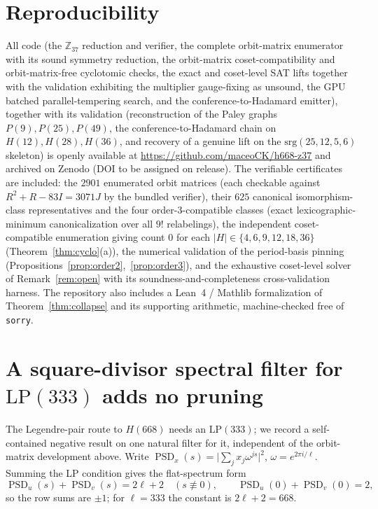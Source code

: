 \documentclass[11pt]{article}
\theoremstyle{definition}
\DeclareMathOperator{\PSD}{PSD}
\newcommand{\Z}{\mathbb{Z}}
\begin{document}
\section*{Reproducibility}
All code (the $\Z_{37}$ reduction and verifier, the complete orbit-matrix enumerator with its sound symmetry
reduction, the orbit-matrix coset-compatibility and orbit-matrix-free cyclotomic checks, the exact and
coset-level SAT lifts together with the validation exhibiting the multiplier gauge-fixing as unsound, the
GPU batched parallel-tempering search, and the conference-to-Hadamard emitter), together with
its validation (reconstruction of the Paley graphs $P(9),P(25),P(49)$, the
conference-to-Hadamard chain on $H(12),H(28),H(36)$, and recovery of a genuine lift on the
$\mathrm{srg}(25,12,5,6)$ skeleton) is openly available at
\url{https://github.com/maceoCK/h668-z37} and archived on Zenodo (DOI to be assigned on release). The
verifiable certificates are included: the $2901$ enumerated orbit matrices (each checkable against
$R^2+R-83I=3071J$ by the bundled verifier), their $625$ canonical isomorphism-class representatives and the
four order-$3$-compatible classes (exact lexicographic-minimum canonicalization over all $9!$ relabelings),
the independent coset-compatible enumeration giving count $0$ for each $|H|\in\{4,6,9,12,18,36\}$
(Theorem~\ref{thm:cyclo}(a)), the numerical validation of the period-basis pinning
(Propositions~\ref{prop:order2},~\ref{prop:order3}), and the exhaustive coset-level solver of
Remark~\ref{rem:open} with its soundness-and-completeness cross-validation harness. The repository also includes a Lean~4
/ Mathlib formalization of Theorem~\ref{thm:collapse} and its supporting arithmetic, machine-checked free
of \texttt{sorry}.

\appendix
\section{A square-divisor spectral filter for $\mathrm{LP}(333)$ adds no pruning}\label{sec:lp}
The Legendre-pair route to $H(668)$ needs an $\mathrm{LP}(333)$; we record a self-contained negative
result on one natural filter for it, independent of the orbit-matrix development above.
Write $\PSD_x(s)=\bigl|\sum_{j}x_j\omega^{js}\bigr|^2$, $\omega=e^{2\pi i/\ell}$. Summing the LP
condition gives the flat-spectrum form
\begin{equation}\label{eq:flat}
\PSD_u(s)+\PSD_v(s)=2\ell+2\quad(s\not\equiv0),\qquad \PSD_u(0)+\PSD_v(0)=2,
\end{equation}
so the row sums are $\pm1$; for $\ell=333$ the constant is $2\ell+2=668$.
\end{document}

